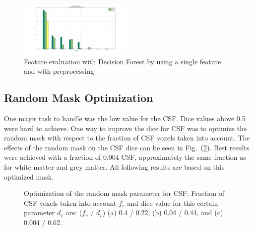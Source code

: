 \documentclass[journal]{IEEEtran}
\begin{document}
\begin{figure}
	\centering
	\includegraphics[width=0.48\textwidth]{images/DF_FE_SF_PP}
	\caption{Feature evaluation with Decision Forest by using a single feature and with preprocessing }
	\label{DF_FeatEval_SF_PP}
\end{figure}



\subsection{Random Mask Optimization}

One major task to handle was the low value for the CSF. Dice values above 0.5 were hard to achieve. One way to improve the dice for CSF was to optimize the random mask with respect to the fraction of CSF voxels taken into account. The effects of the random mask on the CSF dice can be seen in Fig.~(\ref{f.random_mask}). Best results were achieved with a fraction of 0.004 CSF, approximately the same fraction as for white matter and grey matter. All following results are based on this optimized mask.
\begin{figure}[h!]
	\centering
	\hfill
	\hfill
	\caption{Optimization of the random mask parameter for CSF. Fraction of CSF voxels taken into account $f_v$ and dice value for this certain parameter $d_v$ are: ($f_v$ / $d_v$) (a) 0.4 / 0.22, (b) 0.04 / 0.44, and (c) 0.004 / 0.62.}
	\label{f.random_mask}
\end{figure}
\end{document}
